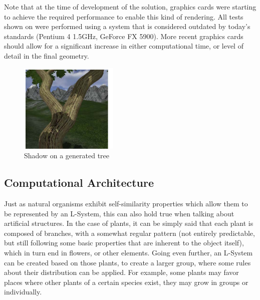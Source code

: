 \documentclass{acmtog}
\begin{document}
Note that at the time of development of the solution, graphics cards were starting to achieve the required performance to enable this kind of rendering. All tests shown on \cite{baele2005real} were performed using a system that is considered outdated by today's standards (Pentium 4 1.5GHz, GeForce FX 5900). More recent graphics cards should allow for a significant increase in either computational time, or level of detail in the final geometry.

\begin{figure}[!htp]
  \begin{center}
    \includegraphics[width=0.6\columnwidth]{images/11_realtime}
    \caption{Shadow on a generated tree \label{fig:realtime2}}
    \end{center}
\end{figure}

\subsection{Computational Architecture}
\label{subsec:architecture}

Just as natural organisms exhibit self-similarity properties which allow them to be represented by an L-System, this can also hold true when talking about artificial structures. In the case of plants, it can be simply said that each plant is composed of branches, with a somewhat regular pattern (not entirely predictable, but still following some basic properties that are inherent to the object itself), which in turn end in flowers, or other elements. Going even further, an L-System can be created based on those plants, to create a larger group, where some rules about their distribution can be applied. For example, some plants may favor places where other plants of a certain species exist, they may grow in groups or individually.
\end{document}
